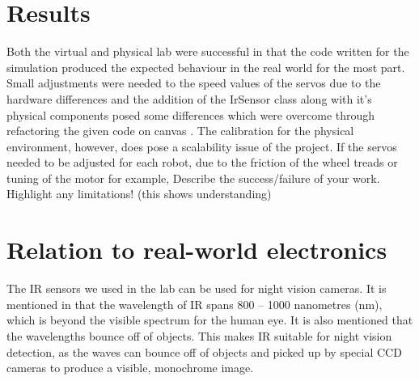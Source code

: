 \documentclass[journal]{IEEEtran}
\begin{document}
\section{Results}
Both the virtual and physical lab were successful in that the code written for the simulation produced the expected behaviour in the real world for the most part. Small adjustments were needed to the speed values of the servos due to the hardware differences and the addition of the IrSensor class along with it's physical components posed some differences which were overcome through refactoring the given code on canvas \cite{elec1601_notes}.
The calibration for the physical environment, however, does pose a scalability issue of the project. If the servos needed to be adjusted for each robot, due to the friction of the wheel treads or tuning of the motor for example, 
Describe the success/failure of your work.
Highlight any limitations! (this shows understanding)

\section{Relation to real-world electronics}

The IR sensors we used in the lab can be used for night vision cameras. It is mentioned in \cite{elec1601_notes} that the wavelength of IR spans 800 – 1000 nanometres (nm), which is beyond the visible spectrum for the human eye. It is also mentioned that the wavelengths bounce off of objects. This makes IR suitable for night vision detection, as the waves can bounce off of objects and picked up by special CCD cameras to produce a visible, monochrome image.



\end{document}
